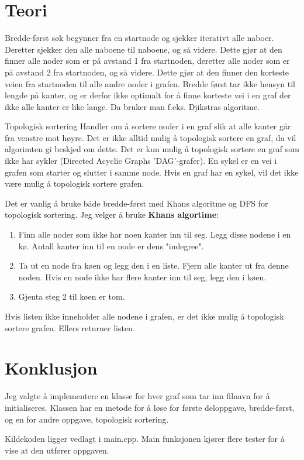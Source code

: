 \documentclass[12pt,a4paper]{article}
\begin{document}
\section{Teori}
Bredde-først søk begynner fra en startnode og sjekker iterativt alle naboer. Deretter sjekker den alle naboene til naboene, og så videre. Dette gjør at den finner alle noder som er på avstand 1 fra startnoden, deretter alle noder som er på avstand 2 fra startnoden, og så videre. Dette gjør at den finner den korteste veien fra startnoden til alle andre noder i grafen. Bredde først tar ikke hensyn til lengde på kanter, og er derfor ikke optimalt for å finne korteste vei i en graf der ikke alle kanter er like lange. Da bruker man f.eks. Djikstras algoritme.

Topologisk sortering Handler om å sortere noder i en graf slik at alle kanter går fra venstre mot høyre. Det er ikke alltid mulig å topologisk sortere en graf, da vil algorimten gi beskjed om dette. Det er kun mulig å topologisk sortere en graf som ikke har sykler (Directed Acyclic Graphs 'DAG'-grafer). En sykel er en vei i grafen som starter og slutter i samme node. Hvis en graf har en sykel, vil det ikke være mulig å topologisk sortere grafen.

Det er vanlig å bruke både bredde-først med Khans algoritme og DFS for topologisk sortering. Jeg velger å bruke \textbf{Khans algortime}:

\begin{enumerate}
    \item Finn alle noder som ikke har noen kanter inn til seg. Legg disse nodene i en kø. Antall kanter inn til en node er dens "indegree".
    \item Ta ut en node fra køen og legg den i en liste. Fjern alle kanter ut fra denne noden. Hvis en node ikke har flere kanter inn til seg, legg den i køen.
    \item Gjenta steg 2 til køen er tom.
  \end{enumerate}

Hvis listen ikke inneholder alle nodene i grafen, er det ikke mulig å topologisk sortere grafen. Ellers returner listen.

\section{Konklusjon}
Jeg valgte å implementere en klasse for hver graf som tar inn filnavn for å initialiseres. Klassen har en metode for å løse for første deloppgave, bredde-først, og en for andre oppgave, topologisk sortering.

Kildekoden ligger vedlagt i main.cpp. Main funksjonen kjører flere tester for å vise at den utfører oppgaven. 
\end{document}
